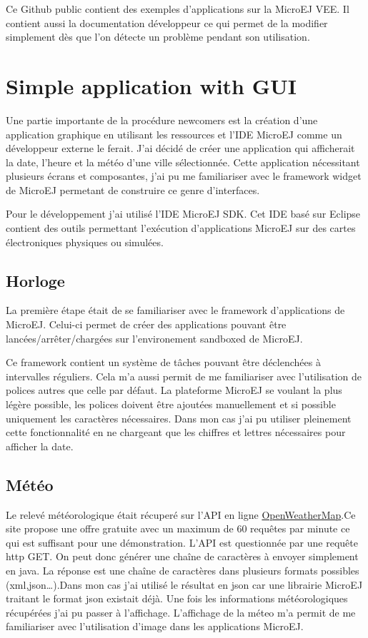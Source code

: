 \documentclass[french,a4paper,12pt]{report}
\begin{document}
Ce Github public contient des exemples d’applications sur la MicroEJ VEE. Il contient aussi la documentation développeur ce qui permet de la modifier simplement dès que l'on détecte un problème pendant son utilisation.

\section{Simple application with GUI}

Une partie importante de la procédure newcomers est la création d'une application graphique en utilisant les ressources et l'IDE MicroEJ comme un développeur externe le ferait. 
J'ai décidé de créer une application qui afficherait la date, l'heure et la météo d'une ville sélectionnée. Cette application nécessitant plusieurs écrans et composantes, j'ai pu me familiariser avec le framework widget de MicroEJ permetant de construire ce genre d'interfaces.

Pour le développement j'ai utilisé l'IDE MicroEJ SDK. Cet IDE basé sur Eclipse contient des outils permettant l’exécution d'applications MicroEJ sur des cartes électroniques physiques ou simulées.

\subsection{Horloge}

La première étape était de se familiariser avec le framework d’applications de MicroEJ. Celui-ci permet de créer des applications pouvant être lancées/arrêter/chargées sur l’environement sandboxed de MicroEJ. 

Ce framework contient un système de tâches pouvant être déclenchées à intervalles réguliers.
Cela m’a aussi permit de me familiariser avec l’utilisation de polices autres que celle par défaut. La plateforme MicroEJ se voulant la plus légère possible, les polices doivent être ajoutées manuellement et si possible uniquement les caractères nécessaires. Dans mon cas j’ai pu utiliser pleinement cette fonctionnalité en ne chargeant que les chiffres et lettres nécessaires pour afficher la date. 

\subsection{Météo}

Le relevé météorologique était récuperé sur l’API en ligne \href{https://openweathermap.org/}{OpenWeatherMap}.Ce site propose une offre gratuite avec un maximum de 60 requêtes par minute ce qui est suffisant pour une démonstration. L’API est questionnée par une requête http GET. On peut donc générer une chaîne de caractères à envoyer simplement en java. La réponse est une chaîne de caractères dans plusieurs formats possibles (xml,json…).Dans mon cas j’ai utilisé le résultat en json car une librairie MicroEJ traitant le format json existait déjà. 
Une fois les informations météorologiques récupérées j’ai pu passer à l’affichage. L’affichage de la méteo m’a permit de me familiariser avec l’utilisation d’image dans les applications MicroEJ. 
\end{document}
